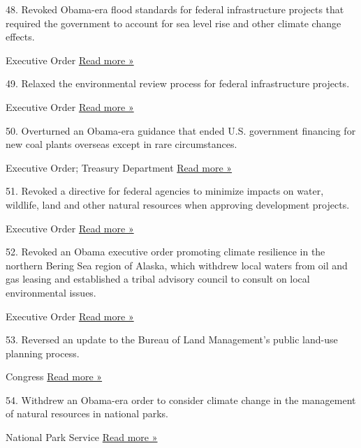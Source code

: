 48. Revoked Obama-era flood standards for federal infrastructure
projects that required the government to account for sea level rise and
other climate change effects.

 Executive Order \textbar{}
\href{https://www.nytimes3xbfgragh.onion/2017/08/15/climate/flooding-infrastructure-climate-change-trump-obama.html}{Read
more »}

49. Relaxed the environmental review process for federal infrastructure
projects.

 Executive Order \textbar{}
\href{https://www.nytimes3xbfgragh.onion/2017/08/15/climate/flooding-infrastructure-climate-change-trump-obama.html}{Read
more »}

50. Overturned an Obama-era guidance that ended U.S. government
financing for new coal plants overseas except in rare circumstances.

 Executive Order; Treasury Department \textbar{}
\href{https://www.devex.com/news/will-new-us-guidance-for-mdbs-mean-more-coal-financing-90836}{Read
more »}

51. Revoked a directive for federal agencies to minimize impacts on
water, wildlife, land and other natural resources when approving
development projects.

 Executive Order \textbar{}
\href{https://www.whitehouse.gov/presidential-actions/presidential-executive-order-promoting-energy-independence-economic-growth/}{Read
more »}

52. Revoked an Obama executive order promoting climate resilience in the
northern Bering Sea region of Alaska, which withdrew local waters from
oil and gas leasing and established a tribal advisory council to consult
on local environmental issues.

 Executive Order \textbar{}
\href{https://www.adn.com/arctic/2017/04/29/bering-sea-tribal-groups-slam-alaska-delegation-for-standing-by-as-trump-struck-order-giving-them-voice/}{Read
more »}

53. Reversed an update to the Bureau of Land Management's public
land-use planning process.

 Congress \textbar{}
\href{https://www.reuters.com/article/us-usa-congress-publicland/senate-revokes-obama-federal-land-planning-rule-idUSKBN16E2UZ}{Read
more »}

54. Withdrew an Obama-era order to consider climate change in the
management of natural resources in national parks.

 National Park Service \textbar{}
\href{https://www.eenews.net/stories/1060059511}{Read more »}

